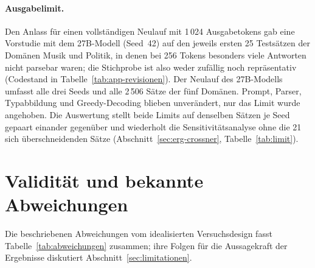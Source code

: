 \paragraph{Ausgabelimit.}
Den Anlass für einen vollständigen Neulauf mit 1\,024 Ausgabetokens gab
eine Vorstudie mit dem 27B-Modell (Seed~42) auf den jeweils ersten
25 Testsätzen der Domänen Musik und Politik, in denen bei 256 Tokens
besonders viele Antworten nicht parsebar waren; die Stichprobe ist also
weder zufällig noch repräsentativ (Codestand in
Tabelle~\ref{tab:app-revisionen}).
Der Neulauf des 27B-Modells umfasst alle drei Seeds und alle 2\,506
Sätze der fünf Domänen. Prompt, Parser, Typabbildung und Greedy-Decoding
blieben unverändert, nur das Limit wurde angehoben.
Die Auswertung stellt beide Limits auf denselben Sätzen je Seed gepaart
einander gegenüber und wiederholt die Sensitivitätsanalyse ohne die
21 sich überschneidenden Sätze (Abschnitt~\ref{sec:erg-crossner},
Tabelle~\ref{tab:limit}).

\section{Validität und bekannte Abweichungen}
\label{sec:validitaet}

Die beschriebenen Abweichungen vom idealisierten Versuchsdesign fasst
Tabelle~\ref{tab:abweichungen} zusammen; ihre Folgen für die Aussagekraft
der Ergebnisse diskutiert Abschnitt~\ref{sec:limitationen}.

